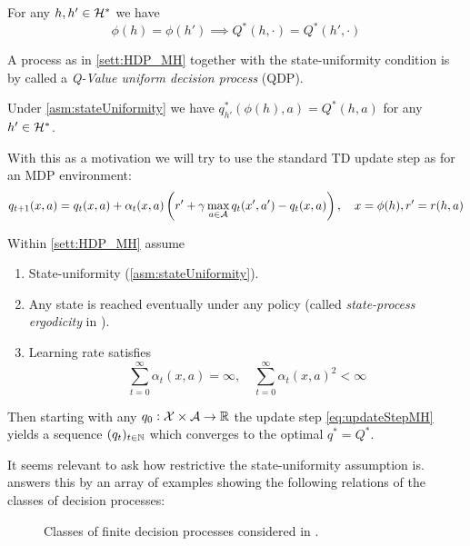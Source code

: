 \begin{asm}
  For any $h,h' \in \mathcal{H}^*$ we have
  \[ \phi(h) = \phi(h') \implies Q^*(h, \cdot) = Q^*(h', \cdot) \]
  \label{asm:stateUniformity}
\end{asm}

A process as in \cref{sett:HDP_MH} together with the state-uniformity condition
is by  called a \emph{Q-Value uniform decision process} (QDP).

\begin{thm}[Hutter, 2016]
  Under \cref{asm:stateUniformity} we have
  $q^*_{h'}(\phi(h), a) = Q^*(h, a)$ for any $h'\in \mathcal{H}^*$.
\end{thm}

With this as a motivation we will try to use
the standard TD update step as for an MDP environment:
\begin{equation}
  q_{t+1}(x, a) = q_t(x, a) + \alpha_t(x, a)
  \left(r' + \gamma \max_{a \in \mathcal{A}} q_t(x', a') - q_t(x, a)\right),
  \quad x = \phi(h), r' = r(h,a)
  \label{eq:updateStepMH}
\end{equation}

\begin{thm}
  Within \cref{sett:HDP_MH} assume
  \begin{enumerate}
    \item State-uniformity (\cref{asm:stateUniformity}).
    \item Any state is reached eventually under any policy
      (called \emph{state-process ergodicity} in ).
    \item Learning rate satisfies
      \[ \sum_{t=0}^\infty \alpha_t(x, a) = \infty, \quad
      \sum_{t=0}^\infty \alpha_t(x, a)^2 < \infty \]
  \end{enumerate}
  Then starting with any $q_0 : \mathcal{X} \times \mathcal{A} \to \mathbb{R}$
  the update step \cref{eq:updateStepMH} yields a sequence
  $(q_t)_{t \in \mathbb{N}}$ which converges to the optimal $q^* = Q^*$.
\end{thm}

It seems relevant to ask how restrictive the state-uniformity assumption is.
 answers this by an array of examples showing the following
relations of the classes of decision processes:

\begin{figure}[H]
  \centering
  \caption{Classes of finite decision processes considered in .}
  \label{fig:DPMH}
\end{figure}

